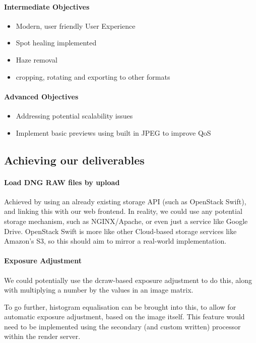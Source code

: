 \documentclass[14pt]{article}
\begin{document}
  \paragraph{Intermediate Objectives}
      \begin{itemize}
        \item Modern, user friendly User Experience
        \item Spot healing implemented
        \item Haze removal
        \item cropping, rotating and exporting to other formats
      \end{itemize}
  \paragraph{Advanced Objectives}
      \begin{itemize}
        \item Addressing potential scalability issues
        \item Implement basic previews using built in JPEG to improve QoS
      \end{itemize}

\subsection{Achieving our deliverables}
  \paragraph{Load DNG RAW files by upload}
    Achieved by using an already existing storage API (such as OpenStack Swift), and
    linking this with our web frontend. In reality, we could use any potential storage
    mechanism, such as NGINX/Apache, or even just a service like Google Drive. OpenStack
    Swift is more like other Cloud-based storage services like Amazon's S3, so this should
    aim to mirror a real-world implementation.

  \paragraph{Exposure Adjustment}
    We could potentially use the dcraw-based exposure adjustment to do this, along with
    multiplying a number by the values in an image matrix.

    To go further, histogram equalisation can be brought into this, to allow for automatic
    exposure adjustment, based on the image itself. This feature would need to be implemented
    using the secondary (and custom written) processor within the render server.
\end{document}
